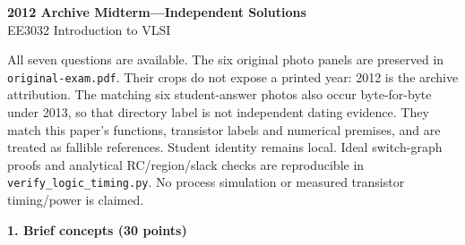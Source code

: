 \documentclass[10pt]{article}
\newcommand{\qheading}[1]{\par\medskip\textbf{#1}\par}
\begin{document}
\begin{center}{\Large\bfseries 2012 Archive Midterm---Independent Solutions}\\EE3032 Introduction to VLSI\end{center}
All seven questions are available. The six original photo panels are preserved in \texttt{original-exam.pdf}. Their crops do not expose a printed year: 2012 is the archive attribution. The matching six student-answer photos also occur byte-for-byte under 2013, so that directory label is not independent dating evidence. They match this paper's functions, transistor labels and numerical premises, and are treated as fallible references. Student identity remains local.
Ideal switch-graph proofs and analytical RC/region/slack checks are reproducible in \texttt{verify\_logic\_timing.py}. No process simulation or measured transistor timing/power is claimed.
\qheading{1. Brief concepts (30 points)}
\end{document}
